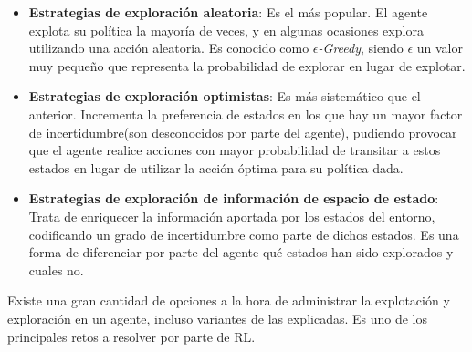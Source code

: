 \documentclass[11pt,fleqn]{book} %
\begin{document}
\begin{itemize}
	\item \textbf{Estrategias de exploración aleatoria}: Es el más popular. El agente explota su política la mayoría de veces, y en algunas ocasiones explora utilizando una acción aleatoria. Es conocido como \textit{$\epsilon$-Greedy}, siendo $\epsilon$ un valor muy pequeño que representa la probabilidad de explorar en lugar de explotar.\\
	
	\item \textbf{Estrategias de exploración optimistas}: Es más sistemático que el anterior. Incrementa la preferencia de estados en los que hay un mayor factor de incertidumbre(son desconocidos por parte del agente), pudiendo provocar que el agente realice acciones con mayor probabilidad de transitar a estos estados en lugar de utilizar la acción óptima para su política dada.\\
	
	\item \textbf{Estrategias de exploración de información de espacio de estado}: Trata de enriquecer la información aportada por los estados del entorno, codificando un grado de incertidumbre como parte de dichos estados. Es una forma de diferenciar por parte del agente qué estados han sido explorados y cuales no.\\
\end{itemize}

Existe una gran cantidad de opciones a la hora de administrar la explotación y exploración en un agente, incluso variantes de las explicadas. Es uno de los principales retos a resolver por parte de RL.


\end{document}
